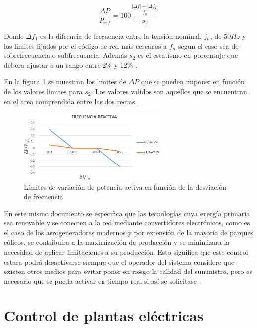 \documentclass{book}
\begin{document}
\begin{equation}\label{eq:PF}
	\frac{\Delta P}{P_{ref}}=100 \frac{\frac{|\Delta f|-|\Delta f_1|}{f_n}}{s_2}
\end{equation} \par

Donde $\Delta f_1$ es la difrencia de frecuencia entre la tensión nominal, $f_n$, de $50Hz$ y los limites fijados por el c\'odigo de red m\'as cercanos a $f_n$ segun el caso sea de sobrefrecuencia o subfrecuencia. Adem\'as $s_2$ es el estatismo en porcentaje que debera ajustar a un rango entre 2\% y 12\% \cite{PO12}. \par

En la figura \ref{FPgridcode} se muestran los limites de $\Delta P$ que se pueden imponer en funci\'on de los valores limites para $s_2$. Los valores validos son aquellos que se encuentran en el area comprendida entre las dos rectas. 

\begin{figure}[h!]
\centering
\includegraphics[width=0.65\textwidth]{FPgridcode.PNG}
\caption{L\'imites de variaci\'on de potencia activa en funci\'on de la desviaci\'on de frecuencia}
\label{FPgridcode}
\end{figure}

En este mismo documento se especifica que las tecnolog\'ias cuya energ\'ia primaria sea renovable y se conecten a la red mediante convertidores electr\'onicos, como es el caso de los aerogeneradores modernos y por extensi\'on de la mayor\'ia de parques e\'olicos, se contribuira a la maximizaci\'on de producci\'on y se minimizara la necesidad de aplicar limitaciones a su producci\'on. Esto significa que este control estara podr\'a desactivarse siempre que el operador del sistema considere que existen otros medios para evitar poner en riesgo la calidad del suministro, pero es necesario que se pueda activar en tiempo real si as\'i se solicitase \cite{PO12}. \par

\chapter{Control de plantas el\'ectricas}
\end{document}
